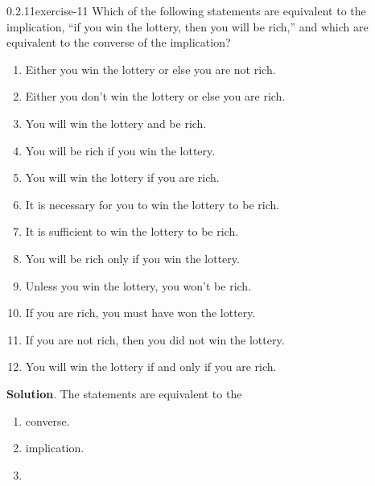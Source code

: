 \documentclass[twoside,11pt,]{book}
\numberwithin{equation}{chapter}
\begin{document}
\begin{divisionsolution}{0.2.11}{}{exercise-11}%
\hypertarget{p-276}{}%
Which of the following statements are equivalent to the implication, ``if you win the lottery, then you will be rich,'' and which are equivalent to the converse of the implication?\leavevmode%
\begin{enumerate}[label=(\alph*)]
\item\hypertarget{li-265}{}\hypertarget{p-277}{}%
Either you win the lottery or else you are not rich.%
\item\hypertarget{li-266}{}\hypertarget{p-278}{}%
Either you don't win the lottery or else you are rich.%
\item\hypertarget{li-267}{}\hypertarget{p-279}{}%
You will win the lottery and be rich.%
\item\hypertarget{li-268}{}\hypertarget{p-280}{}%
You will be rich if you win the lottery.%
\item\hypertarget{li-269}{}\hypertarget{p-281}{}%
You will win the lottery if you are rich.%
\item\hypertarget{li-270}{}\hypertarget{p-282}{}%
It is necessary for you to win the lottery to be rich.%
\item\hypertarget{li-271}{}\hypertarget{p-283}{}%
It is sufficient to win the lottery to be rich.%
\item\hypertarget{li-272}{}\hypertarget{p-284}{}%
You will be rich only if you win the lottery.%
\item\hypertarget{li-273}{}\hypertarget{p-285}{}%
Unless you win the lottery, you won't be rich.%
\item\hypertarget{li-274}{}\hypertarget{p-286}{}%
If you are rich, you must have won the lottery.%
\item\hypertarget{li-275}{}\hypertarget{p-287}{}%
If you are not rich, then you did not win the lottery.%
\item\hypertarget{li-276}{}\hypertarget{p-288}{}%
You will win the lottery if and only if you are rich.%
\end{enumerate}
%
\par\smallskip%
\noindent\textbf{Solution}.\quad%
\hypertarget{p-289}{}%
The statements are equivalent to the\textellipsis{}\leavevmode%
\begin{enumerate}[label=(\alph*)]
\item\hypertarget{li-277}{}\hypertarget{p-290}{}%
converse.%
\item\hypertarget{li-278}{}\hypertarget{p-291}{}%
implication.%
\item\hypertarget{li-279}{}\hypertarget{p-292}{}%

\end{enumerate}
\end{divisionsolution}
\end{document}
